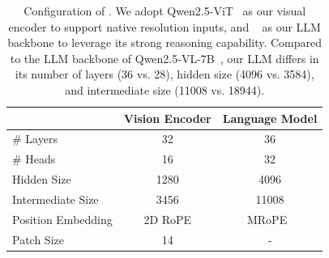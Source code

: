 \begin{table}[h]
\centering
\begin{tabular}{lcc}
\toprule
                  & Vision Encoder & Language Model             \\ \midrule
\# Layers         & 32             & 36                         \\
\# Heads          & 16             & 32                         \\
Hidden Size       & 1280           & 4096                       \\
Intermediate Size & 3456           & 11008                      \\ 
Position Embedding & 2D RoPE       & MRoPE~\citep{bai2025qwen2} \\
Patch Size        & 14             & -                          \\
\bottomrule
\end{tabular}
\caption{Configuration of \mimovl{}. We adopt Qwen2.5-ViT~\citep{Qwen25VL} as our visual encoder to support native resolution inputs, and \mimobase{}~\citep{xia2025mimo} as our LLM backbone to leverage its strong reasoning capability. Compared to the LLM backbone of Qwen2.5-VL-7B~\citep{Qwen25VL}, our LLM differs in its number of layers (36 vs. 28), hidden size (4096 vs. 3584), and intermediate size (11008 vs. 18944).}
\label{tab:model_config}

\end{table}

